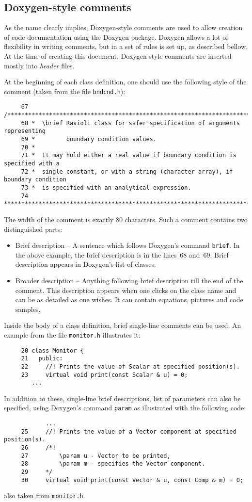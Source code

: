 \subsection{Doxygen-style comments}

As the name clearly implies, Doxygen-style comments are used to allow creation
of code documentation using the Doxygen package. Doxygen allows a lot of 
flexibility in writing comments, but in {\psiboil} a set of rules is set up,
as described bellow. At the time of creating this document, Doxygen-style
comments are inserted mostly into {\em header} files.

At the beginning of each class definition, one should use the following style
of the comment (taken from the file {\tt bndcnd.h}):
%
{\small \begin{verbatim}
     67 /***************************************************************************//**
     68 *  \brief Ravioli class for safer specification of arguments representing
     69 *         boundary condition values.
     70 *
     71 *  It may hold either a real value if boundary condition is specified with a 
     72 *  single constant, or with a string (character array), if boundary condition
     73 *  is specified with an analytical expression.
     74 *******************************************************************************/
\end{verbatim}}
% 
The width of the comment is exactly 80 characters. Such a comment contains two
distinguished parts:
%
\begin{itemize}
  \item Brief description -- A sentence which follows Doxygen's command 
        {\tt brief}. In the above example, the brief description is in the 
        lines~68 and~69. Brief description appears in Doxygen's list of classes.
  \item Broader description -- Anything following brief description till the end
        of the comment. This description appears when one clicks on the class
        name and can be as detailed as one wishes. It can contain equations, 
        pictures and code samples.
\end{itemize}
%
Inside the body of a class definition, brief single-line comments can be used.
An example from the file {\tt monitor.h} illustrates it:
%
{\small \begin{verbatim}
     20 class Monitor {
     21   public:
     22     //! Prints the value of Scalar at specified position(s).
     23     virtual void print(const Scalar & u) = 0;
        ...
\end{verbatim}}
% 
In addition to these, single-line brief descriptions, list of parameters can 
also be specified, using Doxygen's command {\tt param} as illustrated with the
following code:
%
{\small \begin{verbatim}
            ...
     25     //! Prints the value of a Vector component at specified position(s).
     26     /*! 
     27         \param u - Vector to be printed,
     28         \param m - specifies the Vector component.
     29     */
     30     virtual void print(const Vector & u, const Comp & m) = 0;
\end{verbatim}}
% 
also taken from {\tt monitor.h}.


